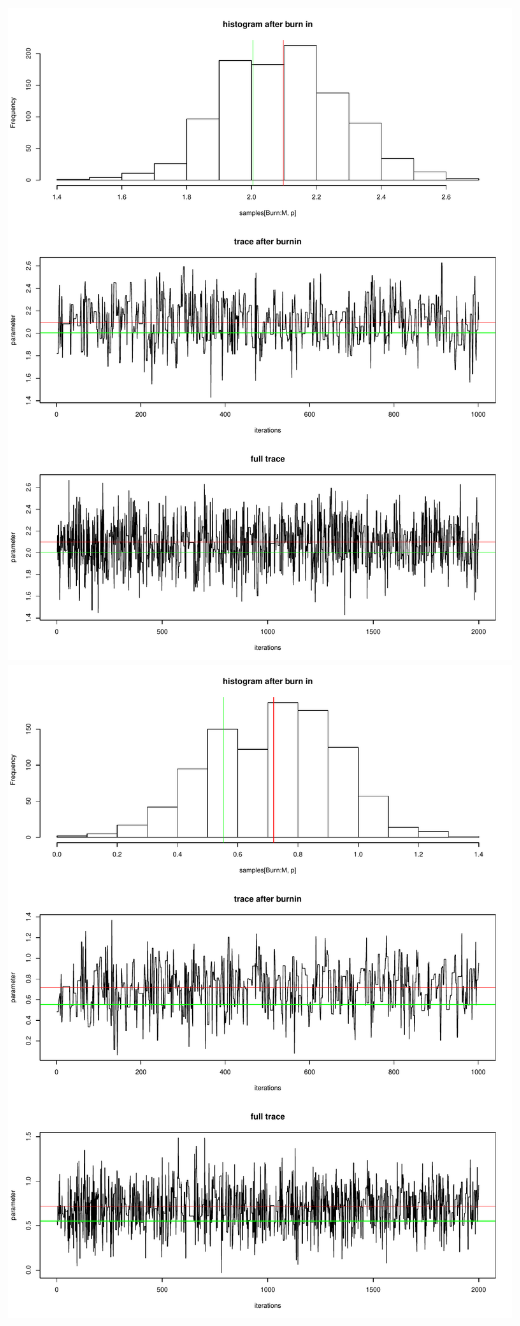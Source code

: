\documentclass[a4paper,12pt]{scrartcl} %
\begin{document}
\clearpage
\includegraphics[scale=0.4]{17}  %
\includegraphics[scale=0.4]{18}
\end{document}
